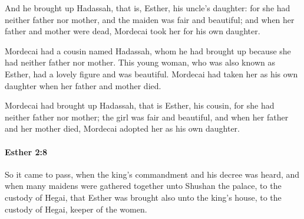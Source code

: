 			\begin{versebox}
					\item[BHS] 
					\item[LXX] 
					\item[ASV] And he brought up Hadassah, that is, Esther, his uncle's daughter: for she had neither father nor mother, and the maiden was fair and beautiful; and when her father and mother were dead, Mordecai took her for his own daughter.
					\item[NIV] Mordecai had a cousin named Hadassah, whom he had brought up because she had neither father nor mother. This young woman, who was also known as Esther, had a lovely figure and was beautiful. Mordecai had taken her as his own daughter when her father and mother died.
					\item[NRSV] Mordecai had brought up Hadassah, that is Esther, his cousin, for she had neither father nor mother; the girl was fair and beautiful, and when her father and her mother died, Mordecai adopted her as his own daughter.
			\end{versebox}

		\paragraph{Esther 2:8} %
			\label{ESTHER-2-8}

			So it came to pass, when the king’s commandment and his decree was heard, and when many maidens were gathered together unto Shushan the palace, to the custody of Hegai, that Esther was brought also unto the king’s house, to the custody of Hegai, keeper of the women.

